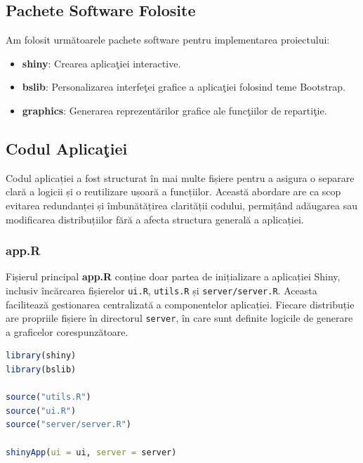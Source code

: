 \documentclass[a4paper,11pt]{article}
\begin{document}
\subsection*{Pachete Software Folosite}

Am folosit urm\u{a}toarele pachete software pentru implementarea proiectului:

\begin{itemize}
    \item \textbf{shiny}: Crearea aplica\c{t}iei interactive.
    \item \textbf{bslib}: Personalizarea interfe\c{t}ei grafice a aplica\c{t}iei folosind teme Bootstrap.
    \item \textbf{graphics}: Generarea reprezent\u{a}rilor grafice ale func\c{t}iilor de reparti\c{t}ie.
\end{itemize}

\newpage

\subsection*{Codul Aplica\c{t}iei}

Codul aplicației a fost structurat în mai multe fișiere pentru a asigura o separare clară a logicii și o reutilizare ușoară a funcțiilor. Această abordare are ca scop evitarea redundanței și îmbunătățirea clarității codului, permițând adăugarea sau modificarea distribuțiilor fără a afecta structura generală a aplicației.

\subsubsection*{app.R}

Fișierul principal \textbf{app.R} conține doar partea de inițializare a aplicației Shiny, inclusiv încărcarea fișierelor \texttt{ui.R}, \texttt{utils.R} și \texttt{server/server.R}. Aceasta facilitează gestionarea centralizată a componentelor aplicației.
Fiecare distribuție are propriile fișiere în directorul \texttt{server}, în care sunt definite logicile de generare a graficelor corespunzătoare.

\begin{lstlisting}[language=R, basicstyle=\ttfamily\footnotesize, keywordstyle=\color{blue}\bfseries, commentstyle=\color{green!60!black}, stringstyle=\color{orange}]
library(shiny)
library(bslib)

source("utils.R")
source("ui.R")
source("server/server.R")

shinyApp(ui = ui, server = server)
\end{lstlisting}
\end{document}
